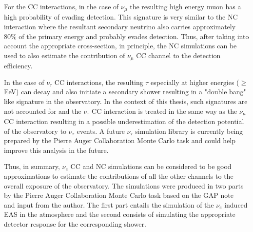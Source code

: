 For the CC interactions, in the case of $\nu_{\mu}$ the resulting high energy muon has a high probability of evading detection. This signature is very similar to the NC interaction where the resultant secondary neutrino also carries approximately 80\% of the primary energy and probably evades detection. Thus, after taking into account the appropriate cross-section, in principle, the NC simulations can be used to also estimate the contribution of $\nu_{\mu}$ CC channel to the detection efficiency.  

In the case of $\nu_{\tau}$ CC interactions, the resulting $\tau$ especially at higher energies ($\geq $EeV) can decay and also initiate a secondary shower resulting in a "double bang" like signature in the observatory. In the context of this thesis, such signatures are not accounted for and the $\nu_{\tau}$ CC interaction is treated in the same way as the $\nu_{\mu}$ CC interaction resulting in a possible underestimation of the detection potential of the observatory to $\nu_{\tau}$ events. A future $\nu_{\tau}$ simulation library is currently being prepared by the Pierre Auger Collaboration Monte Carlo task and could help improve this analysis in the future.

Thus, in summary, $\nu_e$ CC and NC simulations can be considered to be good approximations to estimate the contributions of all the other channels to the overall exposure of the observatory. The simulations were produced in two parts by the Pierre Auger Collaboration Monte Carlo task based on the GAP note~\cite{gap_note_2013} and input from the author. The first part entails the simulation of the $\nu_e$ induced EAS in the atmosphere and the second consists of simulating the appropriate detector response for the corresponding shower. 

